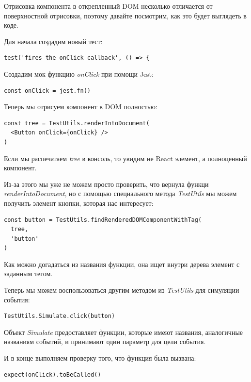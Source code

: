 Отрисовка компонента в открепленный DOM несколько отличается от поверхностной отрисовки, поэтому давайте посмотрим, как это будет выглядеть в коде.

Для начала создадим новый тест:

\begin{lstlisting}
test('fires the onClick callback', () => {
\end{lstlisting} 

Создадим мок функцию \textit{onClick} при помощи Jest:

\begin{lstlisting}
const onClick = jest.fn()
\end{lstlisting}

Теперь мы отрисуем компонент в DOM полностью:

\begin{lstlisting}
const tree = TestUtils.renderIntoDocument(
  <Button onClick={onClick} />
)
\end{lstlisting}

Если мы распечатаем \textit{tree} в консоль, то увидим не React элемент, а полноценный компонент.

Из-за этого мы уже не можем просто проверить, что вернула функци \textit{renderIntoDocument}, но с помощью специального метода \textit{TestUtils} мы можем получить элемент кнопки, которая нас интересует:

\begin{lstlisting}
const button = TestUtils.findRenderedDOMComponentWithTag(
  tree,
  'button'
)
\end{lstlisting}

Как можно догадаться из названия функции, она ищет внутри дерева элемент с заданным тегом.

Теперь мы можем воспользоваться другим методом из \textit{TestUtils} для симуляции события:

\begin{lstlisting}
TestUtils.Simulate.click(button)
\end{lstlisting}

Объект \textit{Simulate} предоставляет функции, которые имеют названия, аналогичные названиям событий, и принимают один параметр для цели события.

И в конце выполняем проверку того, что функция была вызвана:

\begin{lstlisting}
expect(onClick).toBeCalled()
\end{lstlisting}

